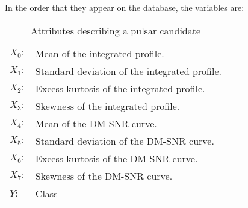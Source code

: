 In the order that they appear on the database, the variables are:

\begin{table}[ht]
    \begin{tabular}{l|l}
        $X_0:$ & Mean of the integrated profile.\\
        $X_1:$ & Standard deviation of the integrated profile.\\
        $X_2:$ & Excess kurtosis of the integrated profile.\\
        $X_3:$ & Skewness of the integrated profile.\\
        $X_4:$ & Mean of the DM-SNR curve.\\
        $X_5:$ & Standard deviation of the DM-SNR curve.\\
        $X_6:$ & Excess kurtosis of the DM-SNR curve.\\
        $X_7:$ & Skewness of the DM-SNR curve.\\
        $Y:$   & Class 
    \end{tabular}
    \caption{Attributes describing a pulsar candidate\label{tab:variables}}
\end{table}